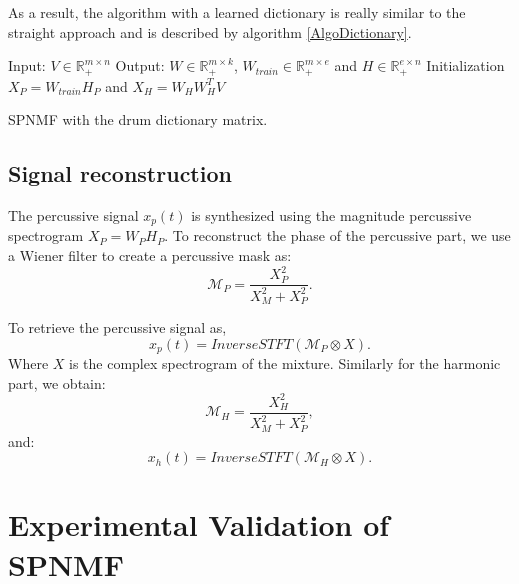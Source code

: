 \documentclass[journal]{IEEEtran}
\begin{document}
As a result, the algorithm with a learned dictionary is really similar to the straight approach and is described by algorithm \ref{AlgoDictionary}.
 
\begin{algorithm}[h]
 Input: $V \in \mathbb{R}_{+}^{m \times n} $
 Output: $W \in \mathbb{R}_{+}^{m \times k}$, $W_{train} \in \mathbb{R}_+^{m \times e}$ and $H \in \mathbb{R}_{+}^{e \times n}$
 Initialization\;
 $ X_P = W_{train}H_P $ and
 $ X_H = W_HW_H^TV $ 
  
\vspace{0.2cm}
 \caption{SPNMF with the drum dictionary matrix.}\label{AlgoDictionary}
\end{algorithm}


 
 
\subsection{Signal reconstruction}

The percussive signal $x_p(t)$ is synthesized using the magnitude percussive spectrogram $X_P = W_PH_P$. To reconstruct the phase of the percussive part, we use a Wiener filter to create a percussive mask as:
\begin{equation}
\mathcal{M}_P = \frac{X_P^2}{X_M^2 + X_P^2}.
\end{equation} 

To retrieve the percussive signal as, 
\begin{equation}
x_p(t) = InverseSTFT(\mathcal{M}_P \otimes X).
\end{equation}
Where $X$ is the complex spectrogram of the mixture.
Similarly for the harmonic part, we obtain:
\begin{equation}\label{percuweiner}
\mathcal{M}_H = \frac{X_H^2}{X_M^2 + X_P^2},
\end{equation}
and:
\begin{equation}
x_h(t) = InverseSTFT(\mathcal{M}_H \otimes X).
\end{equation}

\section{Experimental Validation of SPNMF}
\label{sec:experiments}
\end{document}

